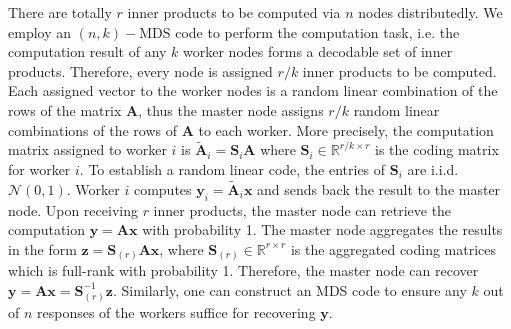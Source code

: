 \documentclass[onecolumn,journal,twoside]{IEEEtran}
\begin{document}
There are totally $r$ inner products to be computed via $n$ nodes distributedly. We employ an $(n,k)-$MDS code to perform the computation task, i.e. the computation result of any $k$ worker nodes forms a decodable set of inner products. Therefore, every node is assigned $r/k$ inner products to be computed. Each assigned vector to the worker nodes is a random linear combination of the rows of the matrix $\mathbf{A}$, thus the master node assigns $r/k$ random linear combinations of the rows of $\mathbf{A}$ to each worker. More precisely, the computation matrix assigned to worker $i$ is $\widetilde{\mathbf{A}}_i=\mathbf{S}_i\mathbf{A}$ where $\mathbf{S}_i\in \mathbb{R} ^{r/k\times r}$ is the coding matrix for worker $i$. To establish a random linear code, the entries of $\mathbf{S}_i$ are i.i.d. $\mathcal{N}(0,1)$. Worker $i$ computes $\mathbf{y}_i=\widetilde{\mathbf{A}}_i\mathbf{x}$ and sends back the result to the master node. Upon receiving $r$ inner products, the master node can retrieve the computation $\mathbf{y}=\mathbf{A}\mathbf{x}$ with probability 1. The master node aggregates the results in the form $\mathbf{z}=\mathbf{S}_{(r)}\mathbf{A}\mathbf{x}$,  where $\mathbf{S}_{(r)}\in \mathbb{R}^{r\times r}$ is the aggregated coding matrices which is full-rank with probability 1. Therefore, the master node can recover $\mathbf{y}=\mathbf{A}\mathbf{x}=\mathbf{S}_{(r)}^{-1}\mathbf{z}$. Similarly, one can construct an MDS code to ensure any $k$ out of $n$ responses of the workers suffice for recovering $\mathbf{y}$. 
\end{document}
